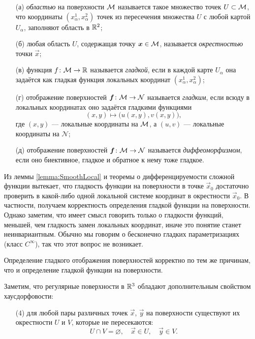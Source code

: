 \begin{enumerate}[nolistsep]
	\item[(а)] \textit{областью} на поверхности $\mathcal{M}$ называется такое множество точек $U \subset \mathcal{M}$, что координаты $(x_\alpha^1, x_\alpha^2)$ точек из пересечения множества $U$ с любой картой $U_\alpha$, заполняют область в $\mathbb{R}^2$;
	\item[(б)] любая область $U$, содержащая точку $\boldsymbol{x} \in \mathcal{M}$, называется \textit{окрестностью} точки $\vec{x}$;
	\item[(в)] функция $f\colon \mathcal{M} \to \mathbb{R}$ называется \textit{гладкой}, если в каждой карте $U_\alpha$ она задаётся как гладкая функция локальных координат $(x_\alpha^1, x_\alpha^2)$;
	\item[(г)] отображение поверхностей $\boldsymbol{f}\colon \mathcal{M} \to \mathcal{N}$ называется \textit{гладким}, если всюду в локальных координатах оно задаётся гладкими функциями
		\[
			(x, y) \mapsto \big(u(x, y), v(x, y)\big),
		\]
		где $(x, y)$ --- локальные координаты на $\mathcal{M}$, а $(u, v)$ --- локальные координаты на $\mathcal{N}$;
	\item[(д)] отображение поверхностей $\boldsymbol{f}\colon \mathcal{M} \to \mathcal{N}$ называется \textit{диффеоморфизмом}, если оно биективное, гладкое и обратное к нему тоже гладкое.
\end{enumerate}

Из леммы \ref{lemma:SmoothLocal} и теоремы о дифференцируемости сложной функции вытекает, что гладкость функции на поверхности в точке $\vec{x}_0$ достаточно проверить в какой-либо одной локальной системе координат в окрестности $\vec{x}_0$. В частности, получаем корректность определения гладкой функции на поверхности. Однако заметим, что имеет смысл говорить только о гладкости функций, меньшей, чем гладкость замен локальных координат, иначе это понятие станет неинвариантным. Обычно мы говорим о бесконечно гладких параметризациях (класс $C^\infty$), так что этот вопрос не возникает.

Определение гладкого отображения поверхностей корректно по тем же причинам, что и определение гладкой функции на поверхности.

Заметим, что регулярные поверхности в $\mathbb{R}^3$ обладают дополнительным свойством хаусдорфовости:
\begin{enumerate}[nolistsep, label=(\arabic*)]
	\item[(4)] для любой пары различных точек $\vec{x}$, $\vec{y}$ на поверхности существуют их окрестности $U$ и $V$, которые не пересекаются:
		\[
			U \cap V = \varnothing,\quad \vec{x} \in U,\quad \vec{y} \in V.
		\]
\end{enumerate}

